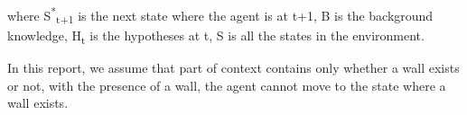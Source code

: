 where S\textsuperscript{*}\textsubscript{t+1} is the next state where the agent is at t+1, 
B is the background knowledge, H\textsubscript{t} is the hypotheses at t, 
S is all the states in the environment.


In this report, we assume that part of context contains only whether a wall exists or not, with the presence of a wall, the agent cannot move to the state where a wall exists.




